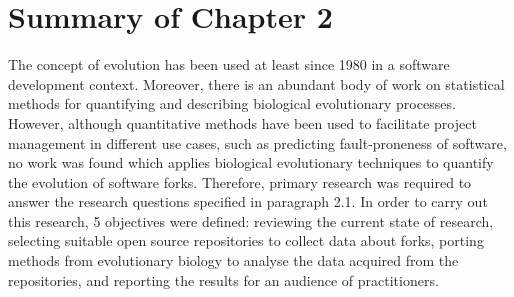 
\section{Summary of Chapter 2}
The concept of evolution has been used at least since 1980 in a software development context. Moreover, there is an abundant body of work on statistical methods for quantifying and describing biological evolutionary processes. However, although quantitative methods have been used to facilitate project management in different use cases, such as predicting fault-proneness of software, no work was found which applies biological evolutionary techniques to quantify the evolution of software forks. Therefore, primary research was required to answer the research questions specified in paragraph 2.1. In order to carry out this research, 5 objectives were defined: reviewing the current state of research, selecting suitable open source repositories to collect data about forks, porting methods from evolutionary biology to analyse the data acquired from the repositories, and reporting the results for an audience of practitioners.

